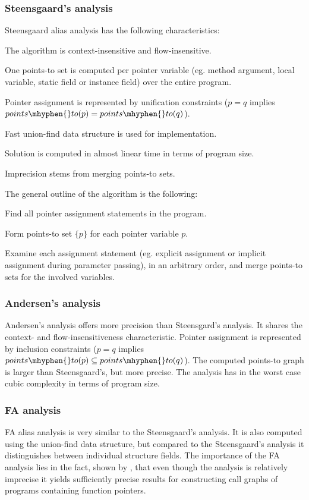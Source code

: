 \subsubsection{Steensgaard's analysis}

Steensgaard alias analysis has the following characteristics:
\begin{itemize*}
\item The algorithm is context-insensitive and flow-insensitive.
\item One points-to set is computed per pointer variable (eg. method argument, local variable, static field or instance field) over the entire program.
\item Pointer assignment is represented by unification constraints ($p = q$ implies $points\mhyphen{}to(p) = points\mhyphen{}to(q)$).
\item Fast union-find data structure is used for implementation. 
\item Solution is computed in almost linear time in terms of program size.
\item Imprecision stems from merging points-to sets.
\end{itemize*}
The general outline of the algorithm is the following:
\begin{itemize*}
\item Find all pointer assignment statements in the program.
\item Form points-to set $\{p\}$ for each pointer variable $p$.
\item Examine each assignment statement (eg. explicit assignment or implicit assignment during parameter passing), in an arbitrary order, and merge points-to sets for the involved variables.
\end{itemize*}

\subsubsection{Andersen's analysis}

Andersen's analysis offers more precision than Steensgard's analysis. It shares the context- and flow-insensitiveness characteristic. Pointer assignment is represented by inclusion constraints ($p = q$ implies $points\mhyphen{}to(p) \subseteq points\mhyphen{}to(q)$). The computed points-to graph is larger than Steensgaard's, but more precise. The analysis has in the worst case cubic complexity in terms of program size.

\subsubsection{FA analysis}

FA alias analysis is very similar to the Steensgaard's analysis. It is also computed using the union-find data structure, but compared to the Steensgaard's analysis it distinguishes between individual structure fields. The importance of the FA analysis lies in the fact, shown by \citet{Milanova2002}, that even though the analysis is relatively imprecise it yields sufficiently precise results for constructing call graphs of programs containing function pointers.
